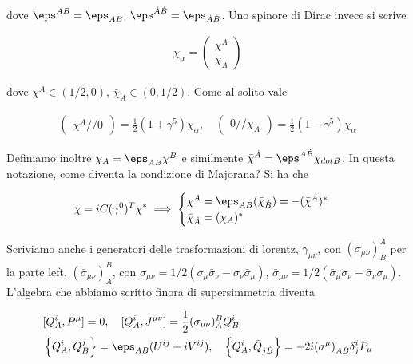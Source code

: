\documentclass{report}
\begin{document}
dove \(\eps^{AB} = \eps_{AB}, \, \eps^{\dot{A}\dot{B}} = \eps_{\dot{A}\dot{B}}\). Uno spinore di Dirac invece si scrive 

\begin{align}
    \chi_\alpha = \begin{pmatrix}
        \chi^A \\ \bar{\chi}_{\dot{A}}
    \end{pmatrix}
\end{align}

dove \(\chi^A \in (1/2, 0)\), \(\bar{\chi}_{\dot{A}} \in (0, 1/2)\). Come al solito vale 

\begin{align}
    \begin{pmatrix}
        \chi^A // 0
    \end{pmatrix} = \frac{1}{2}(1+\gamma^5)\chi_\alpha, \quad \begin{pmatrix}
        0 // \chi_{\dot{A}}
    \end{pmatrix} = \frac{1}{2}(1-\gamma^5)\chi_\alpha
\end{align}

Definiamo inoltre \(\chi_A = \eps_{AB}\chi^B\) e similmente \(\bar{\chi}^{\dot{A}} = \eps^{\dot{A}\dot{B}}\chi_{dot{B}}\). In questa notazione, come diventa la condizione di Majorana? Si ha che 

\begin{align}
    \chi = iC (\gamma^0)^T \chi^* \implies \begin{cases}
        \chi^A = \eps_{AB}(\bar{\chi}_{\dot{B}}) = -(\bar{\chi}^{\dot{A}})^* \\
        \bar{\chi}_{\dot{A}} = (\chi_A)^*
    \end{cases}
\end{align}

Scriviamo anche i generatori delle trasformazioni di lorentz, \(\gamma_{\mu\nu}\), con \((\sigma_{\mu\nu})^A_B\) per la parte left, \((\bar{\sigma}_{\mu\nu})_{\dot{A}}^{\dot{B}}\), con \(\sigma_{\mu\nu} = 1/2(\sigma_\mu \bar{\sigma}_\nu - \sigma_\nu \bar{\sigma}_\mu)\),  \(\bar{\sigma}_{\mu\nu} = 1/2(\bar{\sigma}_\mu \sigma_\nu - \bar{\sigma}_\nu \sigma_\mu)\). L'algebra che abbiamo scritto finora di supersimmetria diventa 

\begin{align}
    &[Q_A^i, P^\mu] = 0, \quad [Q_A^i, J^{\mu\nu}] = \frac{1}{2}(\sigma_{\mu\nu})^B_A Q^i_B \notag \\ 
    &\left\{Q_A^i, Q_B^j \right\} = \eps_{AB}(U^{ij} + iV^{ij}), \quad \left\{Q_A^i, \bar{Q}_{j\dot{B}} \right\} = -2i(\sigma^\mu)_{A \dot{B}}\delta^i_j P_\mu
\end{align}
\end{document}

